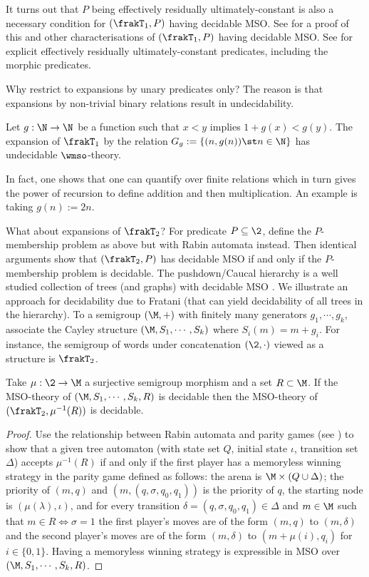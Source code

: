 It turns out that $P$ being effectively residually ultimately-constant is also a necessary condition for $(\frakT_1,P)$ having decidable MSO. See \cite{RaTh06, rabinovich07} for a proof of this and other characterisations of $(\frakT_1,P)$ having decidable MSO. See \cite{CaTo02,Bara07} for explicit effectively residually ultimately-constant predicates, including the morphic predicates.
  
Why restrict to expansions by unary predicates only? The reason is that expansions by non-trivial binary relations result in undecidability. 

\begin{theorem} \cite{ElRa66}
Let $g:\N \to \N$ be a function such that $x < y$ implies $1 + g(x) < g(y)$.
The expansion of $\frakT_1$ by the relation $G_g:= \{(n,g(n)) \st n \in \N\}$ has undecidable $\wmso$-theory.
\end{theorem}

In fact, one shows that one can quantify over finite relations which in turn gives the power of recursion to define addition and then multiplication.
An example is taking $g(n) := 2n$.

What about expansions of $\frakT_2$? For predicate $P \subseteq \2$, define the $P$-membership problem as above but with Rabin automata instead. Then identical arguments show that $(\frakT_2,P)$ has decidable MSO if and only if the $P$-membership problem is decidable.  The pushdown/Caucal hierarchy is a well studied collection of trees (and graphs) 
with decidable MSO \cite{Cauc02} \cite{Thom03}. We illustrate an approach for decidability due to Fratani \cite{Frat05} (that can yield decidability of all trees in the hierarchy). To a semigroup $(\M,+)$ with finitely many generators $g_1,\cdots,g_k$, associate the Cayley structure 
$(\M,S_1,\cdots,S_k)$ where $S_i(m) = m+ g_i$. For instance, the semigroup of words under concatenation $(\2,\cdot)$ viewed as a structure is
$\frakT_2$.  

\begin{theorem} \cite{Frat05}
Take $\mu:\2 \to \M$ a surjective semigroup morphism and a set
$R \subset \M$. If  the MSO-theory of $(\M,S_1,\cdots,S_k,R)$ is decidable then the MSO-theory of $(\frakT_2,\mu^{-1}(R))$ is decidable. 
\end{theorem}

\begin{proof}
Use the relationship between Rabin automata and parity games (see \cite{Thom90}) to show that a given tree automaton (with state set $Q$, initial state $\iota$, transition set $\Delta$) accepts $\mu^{-1}(R)$ if and only if the first player has a memoryless winning strategy in the parity game defined as follows: the arena is $\M \times (Q \cup \Delta)$; the priority of $(m,q)$ and $(m,(q,\sigma,q_0,q_1))$ is the priority of $q$, the starting node is $(\mu(\lambda),\iota)$, and for every transition $\delta = (q,\sigma,q_0,q_1) \in \Delta$ and $m \in \M$ such that $m \in R \iff \sigma = 1$ the first player's moves are of the form $(m,q)$ to $(m,\delta)$ and the second player's moves are of the form $(m,\delta)$ to $(m+\mu(i),q_{i})$ for $i \in \{0,1\}$. Having a memoryless winning strategy is expressible in MSO over $(\M,S_1,\cdots,S_k,R)$.
\end{proof}

